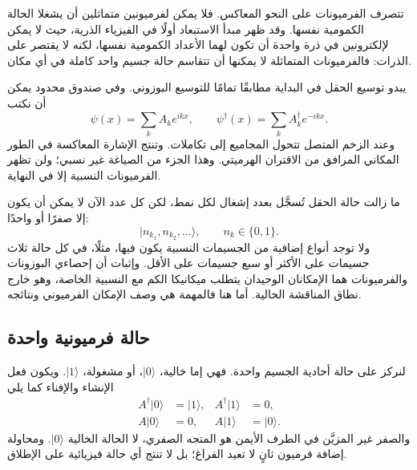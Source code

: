 تتصرف الفرميونات على النحو المعاكس. فلا يمكن لفرميونين متماثلين أن يشغلا الحالة الكمومية نفسها. وقد ظهر مبدأ الاستبعاد أولًا في الفيزياء الذرية، حيث لا يمكن لإلكترونين في ذرة واحدة أن تكون لهما الأعداد الكمومية نفسها، لكنه لا يقتصر على الذرات: فالفرميونات المتماثلة لا يمكنها أن تتقاسم حالة جسيم واحد كاملة في أي مكان.

يبدو توسيع الحقل في البداية مطابقًا تمامًا للتوسيع البوزوني. وفي صندوق محدود يمكن أن نكتب
\begin{equation}
\psi(x)=\sum_k A_k e^{ikx},
\qquad
\psi^\dagger(x)=\sum_k A_k^\dagger e^{-ikx}.
\end{equation}
وعند الزخم المتصل تتحول المجاميع إلى تكاملات. وتنتج الإشارة المعاكسة في الطور المكاني المرافق من الاقتران الهرميتي. وهذا الجزء من الصياغة غير نسبي؛ ولن تظهر الفرميونات النسبية إلا في النهاية.

ما زالت حالة الحقل تُسجَّل بعدد إشغال لكل نمط، لكن كل عدد الآن لا يمكن أن يكون إلا صفرًا أو واحدًا:
\begin{equation}
|n_{k_1},n_{k_2},\ldots\rangle,
\qquad n_k\in\{0,1\}.
\end{equation}
ولا توجد أنواع إضافية من الجسيمات النسبية يكون فيها، مثلًا، في كل حالة ثلاث جسيمات على الأكثر أو سبع جسيمات على الأقل. وإثبات أن إحصاءي البوزونات والفرميونات هما الإمكانان الوحيدان يتطلب ميكانيكا الكم مع النسبية الخاصة، وهو خارج نطاق المناقشة الحالية. أما هنا فالمهمة هي وصف الإمكان الفرميوني ونتائجه.

\subsection{حالة فرميونية واحدة}

لنركز على حالة أحادية الجسيم واحدة. فهي إما خالية، \(|0\rangle\)، أو مشغولة، \(|1\rangle\). ويكون فعل الإنشاء والإفناء كما يلي
\begin{align}
A^\dagger|0\rangle&=|1\rangle,
&
A^\dagger|1\rangle&=0,
\\
A|0\rangle&=0,
&
A|1\rangle&=|0\rangle.
\end{align}
والصفر غير المزيَّن في الطرف الأيمن هو المتجه الصفري، لا الحالة الخالية \(|0\rangle\). ومحاولة إضافة فرميون ثانٍ لا تعيد الفراغ؛ بل لا تنتج أي حالة فيزيائية على الإطلاق.

\begin{classroomqa}
\end{classroomqa}

